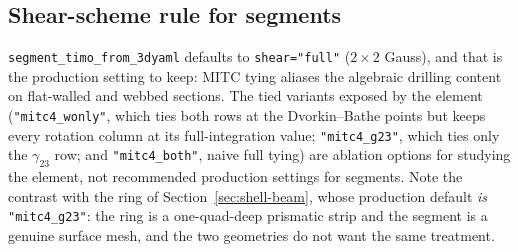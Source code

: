 \subsection{Shear-scheme rule for segments}

\texttt{segment\_timo\_from\_3dyaml} defaults to \texttt{shear="full"}
($2\times2$ Gauss), and that is the production setting to keep: MITC tying
aliases the algebraic drilling content on flat-walled and webbed sections. The
tied variants exposed by the element (\texttt{"mitc4\_wonly"}, which ties both
rows at the Dvorkin--Bathe points but keeps every rotation column at its
full-integration value; \texttt{"mitc4\_g23"}, which ties only the $\gamma_{23}$
row; and \texttt{"mitc4\_both"}, naive full tying) are ablation options for
studying the element, not recommended production settings for segments. Note the
contrast with the ring of Section~\ref{sec:shell-beam}, whose production default
\emph{is} \texttt{"mitc4\_g23"}: the ring is a one-quad-deep prismatic strip and
the segment is a genuine surface mesh, and the two geometries do not want the
same treatment.
